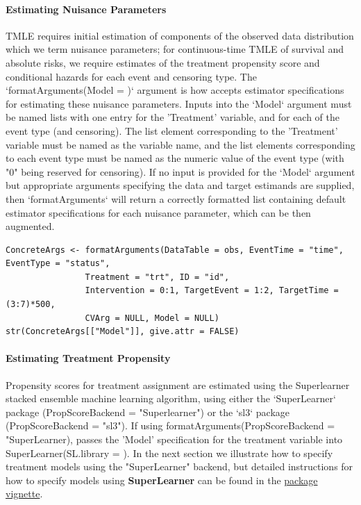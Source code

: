\documentclass{report}
\newcommand{\1}{\ensuremath{\mathbf{1}}}
\begin{document}
\paragraph{Estimating Nuisance Parameters}
\label{NuisanceEstimation}
TMLE requires initial estimation of components of the observed data distribution which we term nuisance parameters; for continuous-time TMLE of survival and absolute risks, we require estimates of the treatment propensity score and conditional hazards for each event and censoring type. The `formatArguments(Model = )` argument is how  accepts estimator specifications for estimating these nuisance parameters. Inputs into the `Model` argument must be named lists with one entry for the 'Treatment' variable, and for each of the event type (and censoring). The list element corresponding to the 'Treatment' variable must be named as the variable name, and the list elements corresponding to each event type must be named as the numeric value of the event type (with "0" being reserved for censoring). If no input is provided for the `Model` argument but appropriate arguments specifying the data and target estimands are supplied, then `formatArguments` will return a correctly formatted list containing default estimator specifications for each nuisance parameter, which can be then augmented.

\begin{lstlisting}
ConcreteArgs <- formatArguments(DataTable = obs, EventTime = "time", EventType = "status", 
				Treatment = "trt", ID = "id", 
				Intervention = 0:1, TargetEvent = 1:2, TargetTime = (3:7)*500, 
				CVArg = NULL, Model = NULL)
str(ConcreteArgs[["Model"]], give.attr = FALSE)
\end{lstlisting}

\paragraph{Estimating Treatment Propensity}
\label{PropScore}
Propensity scores for treatment assignment are estimated using the Superlearner stacked ensemble machine learning algorithm, using either the `SuperLearner` package (PropScoreBackend = "Superlearner") or the `sl3` package (PropScoreBackend = "sl3").  If using formatArguments(PropScoreBackend = "SuperLearner),   passes the 'Model' specification for the treatment variable into SuperLearner(SL.library = ). In the next section we illustrate how to specify treatment models using the "SuperLearner" backend, but detailed instructions for how to specify models using \textbf{SuperLearner} can be found in the \href{https://cran.r-project.org/web/packages/SuperLearner/vignettes/Guide-to-SuperLearner.html}{package vignette}.
\end{document}
